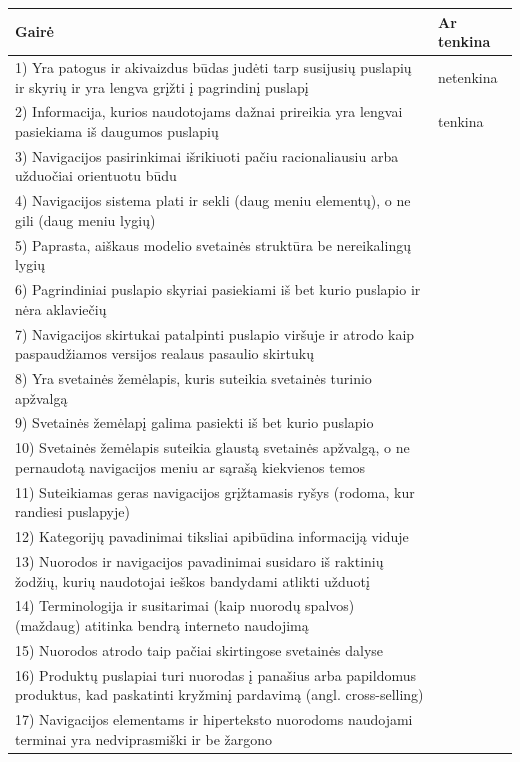 \documentclass{VUMIFPSkursinis}
\begin{document}
\begin{center}
\begin{longtable}{ |p{}|p{2cm}| } 
 \hline
	Gairė & Ar tenkina \\ \hline
	1) Yra patogus ir akivaizdus būdas judėti tarp susijusių puslapių ir skyrių ir yra lengva grįžti į pagrindinį puslapį & netenkina \\ \hline
	2) Informacija, kurios naudotojams dažnai prireikia yra lengvai pasiekiama iš daugumos puslapių & tenkina \\ \hline
	3) Navigacijos pasirinkimai išrikiuoti pačiu racionaliausiu arba užduočiai orientuotu būdu &  \\ \hline
	4) Navigacijos sistema plati ir sekli (daug meniu elementų), o ne gili (daug meniu lygių)  &  \\ \hline
	5) Paprasta, aiškaus modelio svetainės struktūra be nereikalingų lygių &  \\ \hline
	6) Pagrindiniai puslapio skyriai pasiekiami iš bet kurio puslapio ir nėra aklaviečių &  \\ \hline
	7) Navigacijos skirtukai patalpinti puslapio viršuje ir atrodo kaip paspaudžiamos versijos realaus pasaulio skirtukų &  \\ \hline
	8) Yra svetainės žemėlapis, kuris suteikia svetainės turinio apžvalgą &  \\ \hline
	9) Svetainės žemėlapį galima pasiekti iš bet kurio puslapio &  \\ \hline
	10) Svetainės žemėlapis suteikia glaustą svetainės apžvalgą, o ne pernaudotą navigacijos meniu ar sąrašą kiekvienos temos &  \\ \hline
	11) Suteikiamas geras navigacijos grįžtamasis ryšys (rodoma, kur randiesi puslapyje) &  \\ \hline
	12) Kategorijų pavadinimai tiksliai apibūdina informaciją viduje &  \\ \hline
	13) Nuorodos ir navigacijos pavadinimai susidaro iš raktinių žodžių, kurių naudotojai ieškos bandydami atlikti užduotį &  \\ \hline
	14) Terminologija ir susitarimai (kaip nuorodų spalvos) (maždaug) atitinka bendrą interneto naudojimą &  \\ \hline
	15) Nuorodos atrodo taip pačiai skirtingose svetainės dalyse &  \\ \hline
	16) Produktų puslapiai turi nuorodas į panašius arba papildomus produktus, kad paskatinti kryžminį pardavimą (angl. cross-selling) &  \\ \hline
	17) Navigacijos elementams ir hiperteksto nuorodoms naudojami terminai yra nedviprasmiški ir be žargono &  \\ \hline

\end{longtable}
\end{center}
\end{document}
